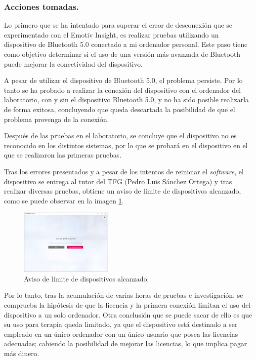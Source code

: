 \subsubsection{Acciones tomadas.}
Lo primero que se ha intentado para superar el error de desconexión que se experimentado con el Emotiv Insight, es realizar pruebas utilizando un dispositivo de Bluetooth 5.0 conectado a mi ordenador personal. Este paso tiene como objetivo determinar si el uso de una versión más avanzada de Bluetooth puede mejorar la conectividad del dispositivo.

A pesar de utilizar el dispositivo de Bluetooth 5.0, el problema persiste. Por lo tanto se ha probado a realizar la conexión del dispositivo con el ordenador del laboratorio, con y sin el dispositivo Bluetooth 5.0, y no ha sido posible realizarla de forma exitosa, concluyendo que queda descartada la posibilidad de que el problema provenga de la conexión.

Después de las pruebas en el laboratorio, se concluye que el dispositivo no es reconocido en los distintos sistemas, por lo que se probará en el dispositivo en el que se realizaron las primeras pruebas.

Tras los errores presentados y a pesar de los intentos de reiniciar el \textit{software}, el dispositivo se entrega al tutor del TFG (Pedro Luis Sánchez Ortega) y tras realizar diversas pruebas, obtiene un aviso de límite de dispositivos alcanzado, como se puede observar en la imagen \ref{fig: LimiteDispositivos}.

\begin{figure}[H]
    \centering
    \includegraphics[width=0.4\textwidth]{img/LimiteDispositivosEmotiv.pdf}
    \caption{Aviso de límite de dispositivos alcanzado.}
    \label{fig: LimiteDispositivos}
\end{figure}

Por lo tanto, tras la acumulación de varias horas de pruebas e investigación, se comprueba la hipótesis de que la licencia y la primera conexión limitan el uso del dispositivo a un solo ordenador. Otra conclusión que se puede sacar de ello es que su uso para terapia queda limitado, ya que el dispositivo está destinado a ser empleado en un único ordenador con un único usuario que posea las licencias adecuadas; cabiendo la posibilidad de mejorar las licencias, lo que implica pagar más dinero.


